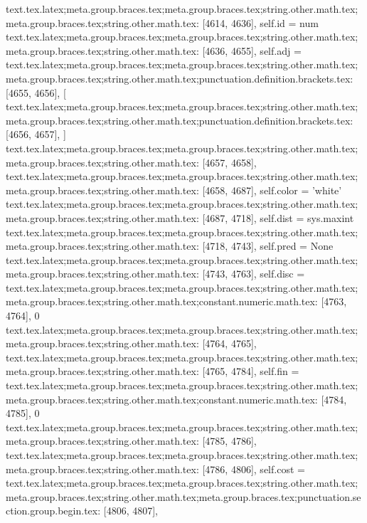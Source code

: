 {{{{{{{{{{{{{{{{{{{{{{{{{{{{{{{{{{{{{{{{{{{{{{{{{{{{{{{{{{{{{{{{{{{{{{{{{{{{{{{{{{{{{{{{{{{{{{{{{{{{{{{{{{{{{{{{{{{{{{{{{{{{{{{{{{{{{{{{{{{{{{{{{}
text.tex.latex;meta.group.braces.tex;meta.group.braces.tex;string.other.math.tex;meta.group.braces.tex;string.other.math.tex: [4614, 4636], {        self.id = num
}
text.tex.latex;meta.group.braces.tex;meta.group.braces.tex;string.other.math.tex;meta.group.braces.tex;string.other.math.tex: [4636, 4655], {        self.adj = }
text.tex.latex;meta.group.braces.tex;meta.group.braces.tex;string.other.math.tex;meta.group.braces.tex;string.other.math.tex;punctuation.definition.brackets.tex: [4655, 4656], {[}
text.tex.latex;meta.group.braces.tex;meta.group.braces.tex;string.other.math.tex;meta.group.braces.tex;string.other.math.tex;punctuation.definition.brackets.tex: [4656, 4657], {]}
text.tex.latex;meta.group.braces.tex;meta.group.braces.tex;string.other.math.tex;meta.group.braces.tex;string.other.math.tex: [4657, 4658], {
}
text.tex.latex;meta.group.braces.tex;meta.group.braces.tex;string.other.math.tex;meta.group.braces.tex;string.other.math.tex: [4658, 4687], {        self.color = 'white'
}
text.tex.latex;meta.group.braces.tex;meta.group.braces.tex;string.other.math.tex;meta.group.braces.tex;string.other.math.tex: [4687, 4718], {        self.dist = sys.maxint
}
text.tex.latex;meta.group.braces.tex;meta.group.braces.tex;string.other.math.tex;meta.group.braces.tex;string.other.math.tex: [4718, 4743], {        self.pred = None
}
text.tex.latex;meta.group.braces.tex;meta.group.braces.tex;string.other.math.tex;meta.group.braces.tex;string.other.math.tex: [4743, 4763], {        self.disc = }
text.tex.latex;meta.group.braces.tex;meta.group.braces.tex;string.other.math.tex;meta.group.braces.tex;string.other.math.tex;constant.numeric.math.tex: [4763, 4764], {0}
text.tex.latex;meta.group.braces.tex;meta.group.braces.tex;string.other.math.tex;meta.group.braces.tex;string.other.math.tex: [4764, 4765], {
}
text.tex.latex;meta.group.braces.tex;meta.group.braces.tex;string.other.math.tex;meta.group.braces.tex;string.other.math.tex: [4765, 4784], {        self.fin = }
text.tex.latex;meta.group.braces.tex;meta.group.braces.tex;string.other.math.tex;meta.group.braces.tex;string.other.math.tex;constant.numeric.math.tex: [4784, 4785], {0}
text.tex.latex;meta.group.braces.tex;meta.group.braces.tex;string.other.math.tex;meta.group.braces.tex;string.other.math.tex: [4785, 4786], {
}
text.tex.latex;meta.group.braces.tex;meta.group.braces.tex;string.other.math.tex;meta.group.braces.tex;string.other.math.tex: [4786, 4806], {        self.cost = }
text.tex.latex;meta.group.braces.tex;meta.group.braces.tex;string.other.math.tex;meta.group.braces.tex;string.other.math.tex;meta.group.braces.tex;punctuation.section.group.begin.tex: [4806, 4807], {{}
}}}}}}}}}}}}}}}}}}}}}}}}}}}}}}}}}}}}}}}}}}}}}}}}}}}}}}}}}}}}}}}}}}}}}}}}}}}}}}}}}}}}}}}}}}}}}}}}}}}}}}}}}}}}}}}}}}}}}}}}}}}}}}}}}}}}}}}}}}}}}}}}}
